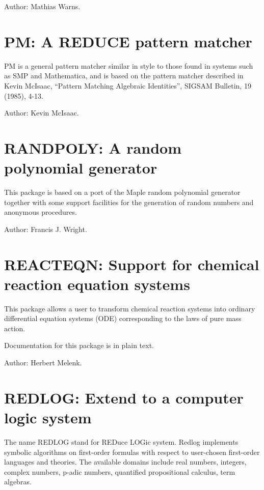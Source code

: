 Author: Mathias Warns.


\newpage

\section{PM: A REDUCE pattern matcher} 

PM is a general pattern matcher similar in style to those found in systems
such as SMP and Mathematica, and is based on the pattern matcher described
in Kevin McIsaac, ``Pattern Matching Algebraic Identities'', SIGSAM Bulletin,
19 (1985), 4-13.

Author: Kevin McIsaac.


\newpage

\section{RANDPOLY: A random polynomial generator} 

This package is based on a port of the Maple random polynomial
generator together with some support facilities for the generation
of random numbers and anonymous procedures.

Author: Francis J. Wright.


\newpage

\section{REACTEQN: Support for chemical reaction equation systems}

This package allows a user to transform chemical reaction systems into
ordinary differential equation systems (ODE) corresponding to the laws of
pure mass action.

Documentation for this package is in plain text.

Author: Herbert Melenk.


\newpage

\section{REDLOG: Extend \REDUCE{} to a computer logic system}

The name REDLOG stand for REDuce LOGic system. Redlog implements
symbolic algorithms on first-order formulas with respect to
user-chosen first-order languages and theories. The available domains
include real numbers, integers, complex numbers, p-adic numbers,
quantified propositional calculus, term algebras.


